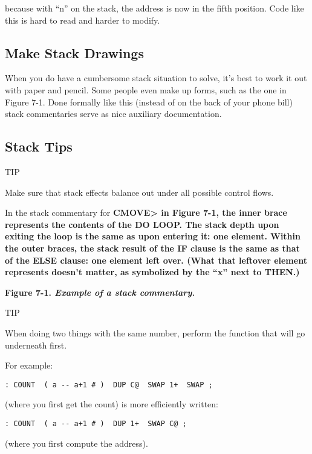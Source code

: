 because with ``n'' on the stack, the address is now in the fifth position.
Code like this is hard to read and harder to modify.

\subsection{Make Stack Drawings}

When you do have a cumbersome stack situation to solve, it's best to work
it out with paper and pencil. Some people even make up forms, such as the
one in Figure 7-1. Done formally like this (instead of on the back of your
phone bill) stack commentaries serve as nice auxiliary documentation.

\subsection{Stack Tips}

TIP

Make sure that stack effects balance out under all possible control flows.

In the stack commentary for \bf{CMOVE>} in Figure 7-1, the inner brace
represents the contents of the \bf{DO LOOP}. The stack depth upon exiting
the loop is the same as upon entering it: one element. Within the outer
braces, the stack result of the \bf{IF} clause is the same as that of the
\bf{ELSE} clause: one element left over. (What that leftover element
represents doesn't matter, as symbolized by the ``x'' next to \bf{THEN}.)

\bf{Figure 7-1.} \emph{Example of a stack commentary.}


TIP

When doing two things with the same number, perform the function that
will go underneath first.

For example:

\begin{verbatim}
: COUNT  ( a -- a+1 # )  DUP C@  SWAP 1+  SWAP ;
\end{verbatim}

(where you first get the count) is more efficiently written:

\begin{verbatim}
: COUNT  ( a -- a+1 # )  DUP 1+  SWAP C@ ;
\end{verbatim}

(where you first compute the address).

